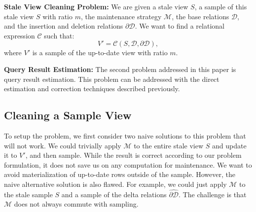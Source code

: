 \vspace{0.25em}
\noindent\textbf{Stale View Cleaning Problem: }\sloppy
We are given a stale view $S$, a sample of this stale view $S$ with ratio $m$, the maintenance strategy $\mathcal{M}$, the base relations $\mathcal{D}$, and
the insertion and deletion relations $\partial \mathcal{D}$.
We want to find a relational expression $\mathcal{C}$ such that:
\[
V' = \mathcal{C}(S,\mathcal{D},\partial \mathcal{D}),
\]
where $V'$ is a sample of the up-to-date view with ratio $m$. 

\noindent\textbf{Query Result Estimation: }
The second problem addressed in this paper is query result estimation.
This problem can be addressed with the direct estimation and correction techniques 
described previously.

\subsection{Cleaning a Sample View}
To setup the problem, we first consider two naive solutions to this problem that will not work. 
We could trivially apply $\mathcal{M}$ to the entire stale view $S$ and update it to $V'$, and then sample.
While the result is correct according to our problem formulation, it does not save us on any computation for maintenance.
We want to avoid materialization of up-to-date rows outside of the sample. 
However, the naive alternative solution is also flawed. 
For example, we could just apply $\mathcal{M}$ to the stale sample $S$ and a sample of the delta relations $\widehat{\partial \mathcal{D}}$. 
The challenge is that $\mathcal{M}$ does not always commute with sampling.

\vspace{0.5em} 

